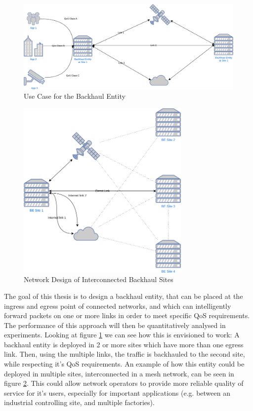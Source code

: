 \begin{figure}[h]
    \centering
        \includegraphics[width=\textwidth]{fig/use_cases.png}
        \caption{Use Case for the Backhaul Entity}
        \label{fig:use}
\end{figure}


\begin{figure}[h]
    \centering
        \includegraphics[width=0.75\textwidth, height=0.75\textwidth]{fig/mesh_network.png}
        \caption{Network Design of Interconnected Backhaul Sites}
        \label{fig:mesh}
\end{figure}

The goal of this thesis is to design a backhaul entity, that can be placed at the ingress and egress point of connected networks, and which can intelligently forward packets on one or more links in order to meet specific QoS requirements. The performance of this approach will then be quantitatively analysed in experiments. Looking at figure \ref{fig:use} we can see how this is envisioned to work: A backhaul entity is deployed in 2 or more sites which have more than one egress link. Then, using the multiple links, the traffic is backhauled to the second site, while respecting it's QoS requirements. An example of how this entity could be deployed in multiple sites, interconnected in a mesh network, can be seen in figure \ref{fig:mesh}. This could allow network operators to provide more reliable quality of service for it's users, especially for important applications (e.g. between an industrial controlling site, and multiple factories).

